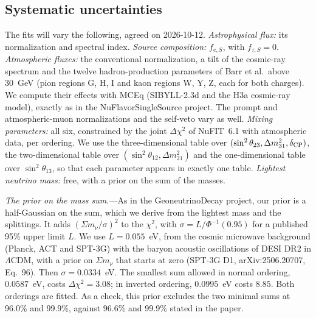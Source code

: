 \documentclass[11pt,a4paper]{article}
\newcommand{\nusum}{\Sigma m_\nu}
\begin{document}
\subsection{Systematic uncertainties}
\label{sec:syst}

The fits will vary the following, agreed on 2026-10-12. \textit{Astrophysical flux:} its
normalization and spectral index. \textit{Source composition:} $f_{e,S}$, with
$f_{\tau,S}=0$. \textit{Atmospheric fluxes:} the conventional normalization, a tilt of the
cosmic-ray spectrum and the twelve hadron-production parameters of Barr et al.\ above 30~GeV
(pion regions G, H, I and kaon regions W, Y, Z, each for both charges). We compute their effects
with MCEq (SIBYLL-2.3d and the H3a cosmic-ray model), exactly as in the NuFlavorSingleSource
project. The prompt and atmospheric-muon normalizations and the self-veto vary as well. \textit{Mixing parameters:} all
six, constrained by the joint $\Delta\chi^2$ of NuFIT~6.1 with atmospheric data, per ordering.
We use the three-dimensional table over $(\sin^2\theta_{23}, \Delta m^2_{31}, \delta_{\rm CP})$,
the two-dimensional table over $(\sin^2\theta_{12}, \Delta m^2_{21})$ and the one-dimensional
table over $\sin^2\theta_{13}$, so that each parameter appears in exactly one table. \textit{Lightest neutrino mass:} free, with a prior on the sum of the masses.

\textit{The prior on the mass sum.}---As in the GeoneutrinoDecay project, our prior is a
half-Gaussian on the sum, which we derive from the lightest mass and the splittings. It adds
$(\nusum/\sigma)^2$ to the $\chi^2$, with $\sigma = L/\Phi^{-1}(0.95)$ for a published 95\%
upper limit $L$. We use $L = 0.055$~eV, from the cosmic microwave background (Planck, ACT and
SPT-3G) with the baryon acoustic oscillations of DESI DR2 in $\Lambda$CDM, with a prior on
$\nusum$ that starts at zero (SPT-3G D1, arXiv:2506.20707, Eq.~96). Then $\sigma = 0.0334$~eV.
The smallest sum allowed in normal ordering, $0.0587$~eV, costs $\Delta\chi^2 = 3.08$; in
inverted ordering, $0.0995$~eV costs $8.85$. Both orderings are fitted. As a check, this prior
excludes the two minimal sums at 96.0\% and 99.9\%, against 96.6\% and 99.9\% stated in the
paper.
\end{document}

